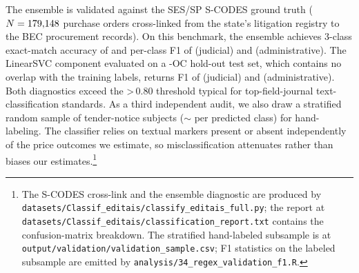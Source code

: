 The ensemble is validated against the SES/SP S-CODES ground truth
($N=179{,}148{}$ purchase orders cross-linked from the
state's litigation registry to the BEC procurement records). On this
benchmark, the ensemble achieves 3-class exact-match accuracy of
\BPregexExactMatchPct{} and per-class F1 of \BPregexFoneJud{}
(judicial) and \BPregexFoneAdm{} (administrative). The LinearSVC
component evaluated on a \BPregexNHO{}-OC hold-out test set, which
contains no overlap with the training labels, returns F1 of
\BPregexFoneJudHO{} (judicial) and \BPregexFoneAdmHO{}
(administrative). Both diagnostics exceed the
\textgreater\,0.80 threshold typical for top-field-journal
text-classification standards. As a third independent audit, we
also draw a stratified random sample of \BPregexNotices{}
tender-notice subjects ($\sim$\BPregexPerClass{} per predicted
class) for hand-labeling. \BPregexValidationStatus{} The classifier
relies on textual markers present or absent independently of the
price outcomes we estimate, so misclassification attenuates rather
than biases our estimates.\footnote{The S-CODES cross-link and the
ensemble diagnostic are produced by
\texttt{datasets/Classif\_editais/classify\_editais\_full.py}; the
report at \texttt{datasets/Classif\_editais/classification\_report.txt}
contains the confusion-matrix breakdown. The stratified
hand-labeled subsample is at
\texttt{output/validation/validation\_sample.csv}; F1 statistics on
the labeled subsample are emitted by
\texttt{analysis/34\_regex\_validation\_f1.R}.}
